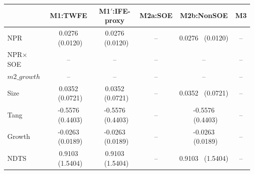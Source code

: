 \begin{tabular}{lccccc}
\hline
 & M1:TWFE & M1$'$:IFE-proxy & M2a:SOE & M2b:NonSOE & M3 \\
\hline
NPR & 0.0276 \ (0.0120) & 0.0276 \ (0.0120) & -- & 0.0276 \ (0.0120) & -- \\
NPR$\times$SOE & -- & -- & -- & -- & -- \\
$m2\_growth$ & -- & -- & -- & -- & -- \\
Size & 0.0352 \ (0.0721) & 0.0352 \ (0.0721) & -- & 0.0352 \ (0.0721) & -- \\
Tang & -0.5576 \ (0.4403) & -0.5576 \ (0.4403) & -- & -0.5576 \ (0.4403) & -- \\
Growth & -0.0263 \ (0.0189) & -0.0263 \ (0.0189) & -- & -0.0263 \ (0.0189) & -- \\
NDTS & 0.9103 \ (1.5404) & 0.9103 \ (1.5404) & -- & 0.9103 \ (1.5404) & -- \\
\hline
\end{tabular}